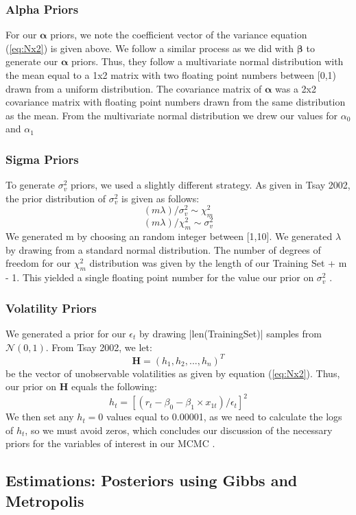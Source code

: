 \documentclass[letterpaper]{article}
\begin{document}
\subsubsection{Alpha Priors}
For our $\bm{\alpha}$ priors, we note the coefficient vector of the variance equation (\ref{eq:Nx2}) is given above. We follow a similar process as we did with $\bm{\beta}$ to generate our $\bm{\alpha}$ priors. Thus, they follow a multivariate normal distribution with the mean equal to a 1x2 matrix with two floating point numbers between [0,1) drawn from a uniform distribution. The covariance matrix of $\bm{\alpha}$ was a 2x2 covariance matrix with floating point numbers drawn from the same distribution as the mean. From the multivariate normal distribution we drew our values for $\alpha_{0}$ and $\alpha_{1}$ \cite{tsay2002}
\subsubsection{Sigma Priors}
To generate $\sigma_{v}^2$ priors, we used a slightly different strategy. As given in Tsay 2002, the prior distribution of $\sigma_{v}^2$ is given as follows:
$$(m\lambda)/\sigma_{v}^2 \mathtt{\sim} \chi_{m}^2 $$
$$(m\lambda)/\chi_{m}^2 \mathtt{\sim} \sigma_{v}^2$$
We generated m by choosing an random integer between [1,10]. We generated $\lambda$ by drawing from a standard normal distribution. The number of degrees of freedom for our $\chi_{m}^2$ distribution was given by the length of our Training Set + m - 1. This yielded a single floating point number for the value our prior on $\sigma_{v}^2$ \cite{tsay2002}.

\subsubsection{Volatility Priors}
We generated a prior for our $\epsilon_{t}$ by drawing |len(TrainingSet)| samples from $\mathcal{N}(0,1)$. \newline
From Tsay 2002, we let:
$$\bm{H} = (h_{1}, h_{2}, ..., h_{n})^T$$
be the vector of unobservable volatilities as given by equation (\ref{eq:Nx2}). Thus, our prior on $\bm{H}$ equals the following:
$$ h_{t}= [(r_{t} - \beta_{0} - \beta_{1} \times x_{1t}) / \epsilon_{t}]^2 $$
We then set any $h_{t} = 0$ values equal to 0.00001, as we need to calculate the logs of $h_{t}$, so we must avoid zeros, which concludes our discussion of the necessary priors for the variables of interest in our MCMC \cite{tsay2002}.

	\subsection{Estimations: Posteriors using Gibbs and Metropolis}
\end{document}

